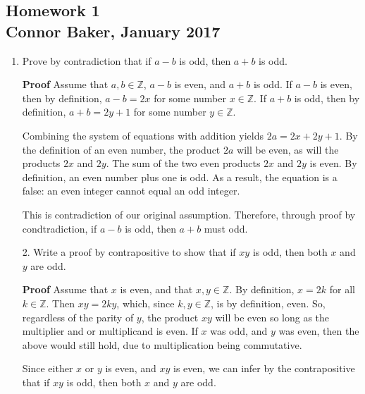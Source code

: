 \documentclass[12pt]{article}
\begin{document}
\begin{center}
\subsection*{Homework 1\\Connor Baker, January 2017}
\end{center}

\begin{enumerate}
\item Prove by contradiction that if $a-b$ is odd, then $a+b$ is odd.
\end{enumerate}

\begin{enumerate}
  \item[\textbf{Proof}] Assume that $a,b\in\mathbb{Z}$, $a-b$ is even, and $a+b$ is odd. If $a-b$ is even, then by definition, $a-b=2x$ for some number $x\in\mathbb{Z}$. If $a+b$ is odd, then by definition, $a+b=2y+1$ for some number $y\in\mathbb{Z}$.
  \item[] Combining the system of equations with addition yields $2a=2x+2y+1$. By the definition of an even number, the product $2a$ will be even, as will the products $2x$ and $2y$. The sum of the two even products $2x$ and $2y$ is even. By definition, an even number plus one is odd. As a result, the equation is a false: an even integer cannot equal an odd integer.
  \item[] This is contradiction of our original assumption. Therefore, through proof by condtradiction, if $a-b$ is odd, then $a+b$ must odd.
\end{enumerate}

\begin{enumerate}
\item[2.] Write a proof by contrapositive to show that if $xy$ is odd, then both $x$ and $y$ are odd.
\end{enumerate}

\begin{enumerate}
  \item[\textbf{Proof}] Assume that $x$ is even, and that $x,y\in\mathbb{Z}$. By definition, $x=2k$ for all $k\in\mathbb{Z}$. Then $xy=2ky$, which, since $k,y\in\mathbb{Z}$, is by definition, even. So, regardless of the parity of $y$, the product $xy$ will be even so long as the multiplier and or multiplicand is even. If $x$ was odd, and $y$ was even, then the above would still hold, due to multiplication being commutative.
  \item[] Since either $x$ or $y$ is even, and $xy$ is even, we can infer by the contrapositive that if $xy$ is odd, then both $x$ and $y$ are odd.
\end{enumerate}
\end{document}
